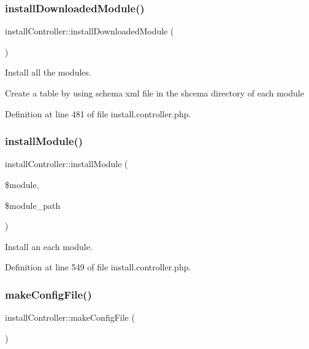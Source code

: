 \subsubsection{\texorpdfstring{install\+Downloaded\+Module()}{installDownloadedModule()}}
{\footnotesize\ttfamily install\+Controller\+::install\+Downloaded\+Module (\begin{DoxyParamCaption}{ }\end{DoxyParamCaption})}



Install all the modules. 

Create a table by using schema xml file in the shcema directory of each module 

Definition at line 481 of file install.\+controller.\+php.

\mbox{\label{classinstallController_a97c582da1e115f0db5256f02d22efc88}} 
\subsubsection{\texorpdfstring{install\+Module()}{installModule()}}
{\footnotesize\ttfamily install\+Controller\+::install\+Module (\begin{DoxyParamCaption}\item[{}]{\$module,  }\item[{}]{\$module\+\_\+path }\end{DoxyParamCaption})}



Install an each module. 



Definition at line 549 of file install.\+controller.\+php.

\mbox{\label{classinstallController_a1ccad92dd450d67e90a2efdde0f6b78a}} 
\subsubsection{\texorpdfstring{make\+Config\+File()}{makeConfigFile()}}
{\footnotesize\ttfamily install\+Controller\+::make\+Config\+File (\begin{DoxyParamCaption}{ }\end{DoxyParamCaption})}




